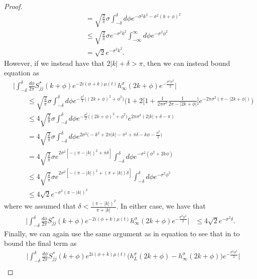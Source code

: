 \documentclass[../thesis-main/thesis-main]{subfiles}
\begin{document}
\begin{proof}
\begin{align}
  & = \sqrt{\frac{2}{\pi}} \sigma \int_{-\delta}^{\delta} d\phi e^{ -\sigma^2 k^2 - \sigma^2 (k + \phi)^2}\\
  & \leq \sqrt{\frac{2}{\pi}} \sigma e^{-\sigma^2 k^2} \int_{-\infty}^\infty d\phi e^{ -\sigma^2 \phi^2}\\
  & = \sqrt{2} e^{-\sigma^2 k^2}.
\end{align}
However, if we instead have that  $2|k| + \delta > \pi$, then we can instead bound equation   as
\begin{align}
&\Big| \int_{-\delta}^\delta \frac{d\phi}{2\pi} S_{jj}^*(k+\phi) e^{- 2 i (\phi + k)\mu(t)} h_\infty^\sigma(2 k+\phi)e^{-\frac{\sigma^2\phi^2}{2}}\Big| \nonumber\\
  & \qquad \leq \sqrt{\frac{2}{\pi}} \sigma \int_{-\delta}^{\delta}d\phi e^{ -\frac{\sigma^2}{2} \big( (2k+ \phi)^2 + \phi^2\big)}\Bigg( 1 + 2 \Bigg[ 1 + \frac{1}{2\pi \sigma^2} \frac{1}{ 2\pi - |2k + \phi|}\Bigg] e^{- 2\pi \sigma^2 (\pi - |2k + \phi|)}\Bigg)\\
  &\qquad \leq 4 \sqrt{\frac{2}{\pi}}\sigma \int_{-\delta}^{\delta} d\phi e^{ -\frac{\sigma^2}{2} \big( (2k+ \phi)^2 + \phi^2\big)} e^{2 \pi \sigma^2 (2 |k| + \delta - \pi)}\\
  &\qquad =4 \sqrt{\frac{2}{\pi}}\sigma \int_{-\delta}^{\delta} d\phi  e^{  2\sigma^2 \big(-k^2 +2\pi |k| -\pi^2 + \pi \delta - k\phi - \frac{\phi^2}{2} \big)}\\
  &\qquad =4 \sqrt{\frac{2}{\pi}}\sigma e^{2\sigma^2[-(\pi - |k|)^2 + \pi \delta]}\int_{-\delta}^{\delta} d\phi e^{  -\sigma^2 (\phi^2 + 2k\phi )}\\
  &\qquad \leq 4 \sqrt{\frac{2}{\pi}}\sigma e^{2\sigma^2[-(\pi - |k|)^2 + (\pi + |k|) \delta]} \int_{-\delta}^{\delta} d\phi e^{- \sigma^2 \phi^2}\\
  & \qquad \leq 4\sqrt{2} e^{ -\sigma^2 (\pi - |k|)^2}
  \end{align}
where we assumed that $\delta < \frac{(\pi-|k|)^2}{\pi + |k|}$.  In either case, we have that 
\begin{align}
\Big| \int_{-\delta}^\delta \frac{d\phi}{2\pi} S_{jj}^*(k+\phi) e^{- 2 i (\phi + k)\mu(t)} h_\infty^\sigma(2 k+\phi) e^{-\frac{\sigma^2\phi^2}{2}}\Big|
  & \leq 4 \sqrt{2} e^{ - \sigma^2 \delta}\label{eq:gaussian_cross_term_bound}.
\end{align}
Finally, we can again use the same argument as in equation    to see that in to bound the final term as
\begin{align}
  & \Big| \int_{-\delta}^\delta \frac{d\phi}{2\pi} S_{jj}^*(k+\phi) e^{2 i (\phi + k)\mu(t)} \big( h_L^\sigma (2k + \phi) - h_{\infty}^\sigma(2k+\phi)\big) e^{-\frac{\sigma^2\phi^2}{2}}\Big| \nonumber\\

\end{align}
\end{proof}
\end{document}
